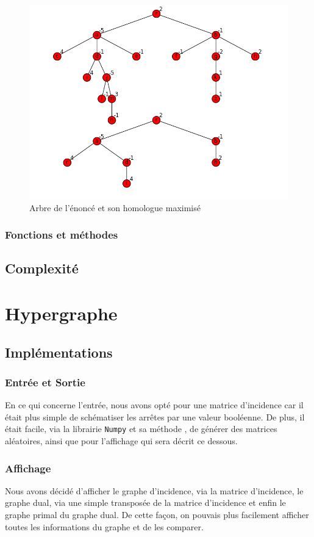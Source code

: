 \documentclass[a4papper]{article}
\begin{document}
\begin{figure}[h!]
	\centering
	\includegraphics[width=\linewidth]{Arbre.png}
	\caption{Arbre de l'énoncé et son homologue maximisé}

\end{figure}
		\subsubsection{Fonctions et méthodes}
			
			
	\subsection{Complexité}

\section{Hypergraphe}
	\subsection{Implémentations}
		\subsubsection{Entrée et Sortie}
			En ce qui concerne l'entrée, nous avons opté pour une matrice d'incidence car il était plus simple de schématiser les arrêtes par une valeur booléenne. De plus, il était facile, via la librairie \texttt{Numpy} et sa méthode , de générer des matrices aléatoires, ainsi que pour l'affichage qui sera décrit ce dessous.
		\subsubsection{Affichage}
			Nous avons décidé d'afficher le graphe d'incidence, via la matrice d'incidence, le graphe dual, via une simple transposée de la matrice d'incidence et enfin le graphe primal du graphe dual. De cette façon, on pouvais plus facilement afficher toutes les informations du graphe et de les comparer.\\
\end{document}

